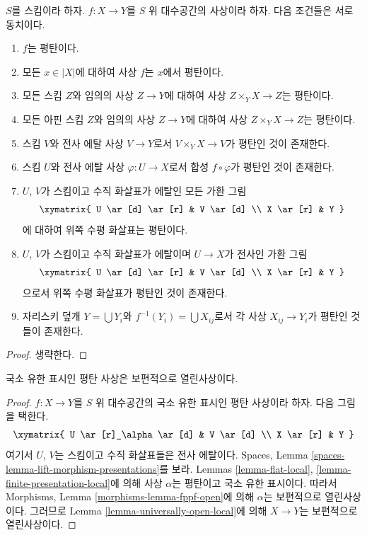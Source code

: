 \begin{lemma}
\label{lemma-flat-local}
$S$를 스킴이라 하자.
$f : X \to Y$를 $S$ 위 대수공간의 사상이라 하자.
다음 조건들은 서로 동치이다.
\begin{enumerate}
\item $f$는 평탄이다.
\item 모든 $x \in |X|$에 대하여 사상 $f$는 $x$에서 평탄이다.
\item 모든 스킴 $Z$와 임의의 사상 $Z \to Y$에 대하여 사상
$Z \times_Y X \to Z$는 평탄이다.
\item 모든 아핀 스킴 $Z$와 임의의 사상 $Z \to Y$에 대하여 사상
$Z \times_Y X \to Z$는 평탄이다.
\item 스킴 $V$와 전사 에탈 사상 $V \to Y$로서
$V \times_Y X \to V$가 평탄인 것이 존재한다.
\item 스킴 $U$와 전사 에탈 사상 $\varphi : U \to X$로서
합성 $f \circ \varphi$가 평탄인 것이 존재한다.
\item $U$, $V$가 스킴이고 수직 화살표가 에탈인 모든 가환 그림
$$
\xymatrix{
U \ar[d] \ar[r] & V \ar[d] \\
X \ar[r] & Y
}
$$
에 대하여 위쪽 수평 화살표는 평탄이다.
\item $U$, $V$가 스킴이고 수직 화살표가 에탈이며
$U \to X$가 전사인 가환 그림
$$
\xymatrix{
U \ar[d] \ar[r] & V \ar[d] \\
X \ar[r] & Y
}
$$
으로서 위쪽 수평 화살표가 평탄인 것이 존재한다.
\item 자리스키 덮개 $Y = \bigcup Y_i$와
$f^{-1}(Y_i) = \bigcup X_{ij}$로서 각 사상
$X_{ij} \to Y_i$가 평탄인 것들이 존재한다.
\end{enumerate}
\end{lemma}

\begin{proof}
생략한다.
\end{proof}

\begin{lemma}
\label{lemma-fppf-open}
국소 유한 표시인 평탄 사상은 보편적으로 열린사상이다.
\end{lemma}

\begin{proof}
$f : X \to Y$를 $S$ 위 대수공간의 국소 유한 표시인 평탄 사상이라
하자. 다음 그림을 택한다.
$$
\xymatrix{
U \ar[r]_\alpha \ar[d] & V \ar[d] \\
X \ar[r] & Y
}
$$
여기서 $U$, $V$는 스킴이고 수직 화살표들은 전사 에탈이다.
Spaces, Lemma \ref{spaces-lemma-lift-morphism-presentations}를 보라.
Lemmas \ref{lemma-flat-local},
\ref{lemma-finite-presentation-local}에 의해 사상 $\alpha$는
평탄이고 국소 유한 표시이다. 따라서 Morphisms, Lemma
\ref{morphisms-lemma-fppf-open}에 의해 $\alpha$는 보편적으로 열린사상이다.
그러므로 Lemma \ref{lemma-universally-open-local}에 의해
$X \to Y$는 보편적으로 열린사상이다.
\end{proof}

